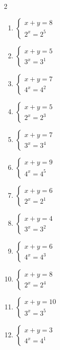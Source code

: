 \documentclass[12pt,a4paper]{article}
\begin{document}
\begin{multicols}{2}
\begin{enumerate}[leftmargin=*, itemsep=6pt]
\item \(\begin{cases} x+y=8\\ 2^x=2^{5}\end{cases}\)

\item \(\begin{cases} x+y=5\\ 3^x=3^{1}\end{cases}\)

\item \(\begin{cases} x+y=7\\ 4^x=4^{2}\end{cases}\)

\item \(\begin{cases} x+y=5\\ 2^x=2^{3}\end{cases}\)

\item \(\begin{cases} x+y=7\\ 3^x=3^{4}\end{cases}\)

\item \(\begin{cases} x+y=9\\ 4^x=4^{5}\end{cases}\)

\item \(\begin{cases} x+y=6\\ 2^x=2^{1}\end{cases}\)

\item \(\begin{cases} x+y=4\\ 3^x=3^{2}\end{cases}\)

\item \(\begin{cases} x+y=6\\ 4^x=4^{3}\end{cases}\)

\item \(\begin{cases} x+y=8\\ 2^x=2^{4}\end{cases}\)

\item \(\begin{cases} x+y=10\\ 3^x=3^{5}\end{cases}\)

\item \(\begin{cases} x+y=3\\ 4^x=4^{1}\end{cases}\)

\end{enumerate}
\end{multicols}
\newpage
\end{document}
